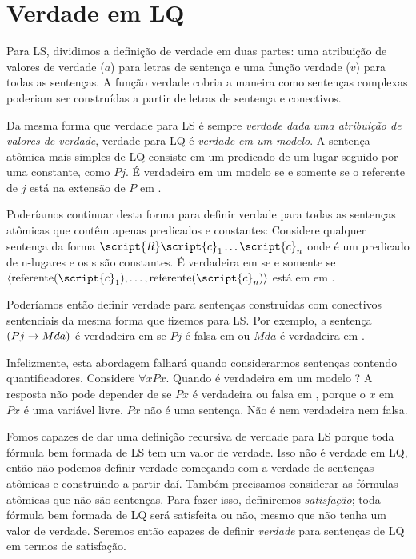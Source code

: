 \section{Verdade em LQ}
\label{sec.TruthInQL}
Para LS, dividimos a definição de verdade em duas partes: uma atribuição de valores de verdade ($a$) para letras de sentença e uma função verdade ($v$) para todas as sentenças. A função verdade cobria a maneira como sentenças complexas poderiam ser construídas a partir de letras de sentença e conectivos.

Da mesma forma que verdade para LS é sempre \emph{verdade dada uma atribuição de valores de verdade}, verdade para LQ é \emph{verdade em um modelo}. A sentença atômica mais simples de LQ consiste em um predicado de um lugar seguido por uma constante, como $Pj$. É verdadeira em um modelo  se e somente se o referente de $j$ está na extensão de $P$ em .

Poderíamos continuar desta forma para definir verdade para todas as sentenças atômicas que contêm apenas predicados e constantes: Considere qualquer sentença da forma $\script{R}\script{c}_1\ldots\script{c}_n$ onde  é um predicado de n-lugares e os s são constantes. É verdadeira em  se e somente se ${\langle}\referent{\script{c}_1},\ldots,\referent{\script{c}_n}{\rangle}$ está em  em .

Poderíamos então definir verdade para sentenças construídas com conectivos sentenciais da mesma forma que fizemos para LS. Por exemplo, a sentença $(Pj \rightarrow Mda)$ é verdadeira em  se $Pj$ é falsa em  ou $Mda$ é verdadeira em .

Infelizmente, esta abordagem falhará quando considerarmos sentenças contendo quantificadores. Considere $\forall x Px$. Quando é verdadeira em um modelo ? A resposta não pode depender de se $Px$ é verdadeira ou falsa em , porque o $x$ em $Px$ é uma variável livre. $Px$ não é uma sentença. Não é nem verdadeira nem falsa.

Fomos capazes de dar uma definição recursiva de verdade para LS porque toda fórmula bem formada de LS tem um valor de verdade. Isso não é verdade em LQ, então não podemos definir verdade começando com a verdade de sentenças atômicas e construindo a partir daí. Também precisamos considerar as fórmulas atômicas que não são sentenças. Para fazer isso, definiremos \emph{satisfação}; toda fórmula bem formada de LQ será satisfeita ou não, mesmo que não tenha um valor de verdade. Seremos então capazes de definir \emph{verdade} para sentenças de LQ em termos de satisfação.

